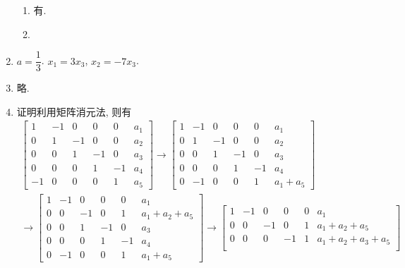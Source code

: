 \documentclass[a4paper, 11pt]{ctexart}
\begin{document}
\begin{enumerate}
\begin{enumerate}[(1)]
                \item %
                    有.
                \item %
            \end{enumerate}
        \item %
            $a = \dfrac13$. $x_1 = 3x_3$, $x_2 = -7x_3$.
        \item %
            略.
        \item %
            {\heiti 证明}\quad 利用矩阵消元法, 则有
            \begin{gather*}
                \begin{bmatrix}
                    1 & -1 & 0 & 0 & 0 & a_1 \\
                    0 & 1 & -1 & 0 & 0 & a_2 \\
                    0 & 0 & 1 & -1 & 0 & a_3 \\ 
                    0 & 0 & 0 & 1 & -1 & a_4 \\
                    -1 & 0 & 0 & 0 & 1 & a_5
                \end{bmatrix} \rightarrow
                \begin{bmatrix}
                    1 & -1 & 0 & 0 & 0 & a_1 \\
                    0 & 1 & -1 & 0 & 0 & a_2 \\
                    0 & 0 & 1 & -1 & 0 & a_3 \\ 
                    0 & 0 & 0 & 1 & -1 & a_4 \\
                    0 & -1 & 0 & 0 & 1 & a_1 + a_5
                \end{bmatrix} \\
                \rightarrow \begin{bmatrix}
                    1 & -1 & 0 & 0 & 0 & a_1 \\
                    0 & 0 & -1 & 0 & 1 & a_1 + a_2 + a_5 \\
                    0 & 0 & 1 & -1 & 0 & a_3 \\ 
                    0 & 0 & 0 & 1 & -1 & a_4 \\
                    0 & -1 & 0 & 0 & 1 & a_1 + a_5
                \end{bmatrix}
                \rightarrow \begin{bmatrix}
                    1 & -1 & 0 & 0 & 0 & a_1 \\
                    0 & 0 & -1 & 0 & 1 & a_1 + a_2 + a_5 \\
                    0 & 0 & 0 & -1 & 1 & a_1 + a_2 + a_3 + a_5 \\ 

\end{bmatrix}
\end{gather*}
\end{enumerate}
\end{document}
